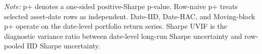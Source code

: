 \begin{table}[!htbp]
\centering
\small
\caption{Row-naive and date-level inference comparisons for panel candidates.}
\label{tab:standard-comparator}
\par\footnotesize\emph{Note:} p+ denotes a one-sided positive-Sharpe p-value. Row-naive p+ treats selected asset-date rows as independent. Date-IID, Date-HAC, and Moving-block p+ operate on the date-level portfolio return series. Sharpe UVIF is the diagnostic variance ratio between date-level long-run Sharpe uncertainty and row-pooled IID Sharpe uncertainty.
\end{table}
